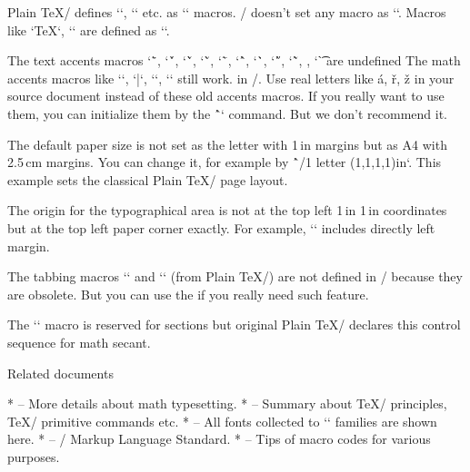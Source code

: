 {\new
Plain \TeX/ defines `\newcount`, `\bye` etc. as `\outer` macros. \OpTeX/
doesn't set any macro as `\outer`. Macros like `\TeX`, `\rm` are defined as
`\protected`.

\new
The text accents macros `\"`, `\'`, `\v`, `\u`, `\=`, `\^`, `\.`, `\H`,
`\~`, , `\t`   are undefined\fnote
{The math accents macros like `\acute`, `\bar`, `\dot`, `\hat` still work.}
in \OpTeX/. Use real
letters like á, ř, ž in your source document instead of these old accents macros.
If you really want to use them, you can initialize them by the \^`\oldaccents`
command. But we don't recommend it.

\new
The default paper size is not set as the letter with 1\,in margins but as A4 with
2.5\,cm margins. You can change it, for example by
\^`\margins/1 letter (1,1,1,1)in`. This example sets the classical Plain \TeX/
page layout.

\new
The origin for the typographical area is not at the top left 1\,in 1\,in coordinates
but at the top left paper corner exactly. For example, `\hoffset` includes directly left
margin.

The tabbing macros `\settabs` and `\+` (from Plain \TeX/)
are not defined in \OpTeX/ because they are obsolete. But you can use the
if you really need such feature.

The `\sec` macro is reserved for sections but original Plain \TeX/ declares this
control sequence for math secant.

\sec Related documents

\begitems
*  --
  More details about math typesetting.
*  --
  Summary about \TeX/ principles, \TeX/ primitive commands etc.
*  --
  All fonts collected to `\fontfam` families are shown here.
*  --
  \OpTeX/ Markup Language Standard.
*  --
  Tips of macro codes for various purposes.

\enditems

\enddocument


}
